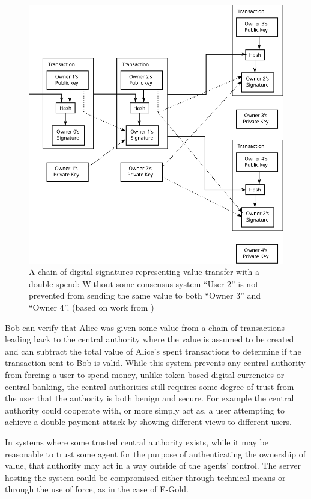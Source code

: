 \begin{figure}[htb]
    \centering
    \includegraphics[width=0.9\columnwidth ]{img/Bitcoin_DoubleSpend_Visual}
    \caption{A chain of digital signatures representing value transfer with a double spend: Without some consensus system ``User 2'' is not prevented from sending the same value to both ``Owner 3'' and ``Owner 4''.
    (based on work from \protect\cite{satoshi})}
    \label{fig:chain-double-spend}
\end{figure}

Bob can verify that Alice was given some value from a chain of transactions
leading back to the central authority where the value is assumed to be created
and can subtract the total value of Alice's spent transactions to determine if
the transaction sent to Bob is valid.  While this system prevents any central
authority from forcing a user to spend money, unlike token based digital
currencies or central banking, the central authorities still requires some degree of trust from the user that the
authority is both benign and secure. For example the central authority could
cooperate with, or more simply act as, a user attempting to achieve a double
payment attack by showing different views to different users.

In systems where some trusted central authority exists, while it may be reasonable to
trust some agent for the purpose of authenticating the ownership of value, that
authority may act in a way outside of the agents' control.  The server hosting
the system could be compromised either through technical means or through the
use of force, as in the case of E-Gold.

